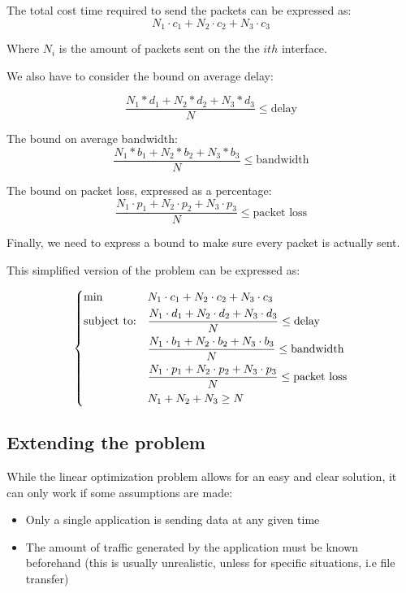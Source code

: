 \documentclass{article}
\begin{document}
The total cost time required to send the packets can be expressed as:
\[
	N_1 \cdot c_1 +
	N_2 \cdot c_2 +
	N_3 \cdot c_3 
\]

Where $N_i$ is the amount of packets sent on the the $ith$ interface.

We also have to consider the bound on average delay:

\[
	\frac
	{N_1 * d_1 + N_2 * d_2  + N_3 * d_3 }
	{N}
	 \le \text{delay}
\]

The bound on average bandwidth:
\[
\frac
{N_1 * b_1 + N_2 * b_2  + N_3 * b_3 }
{N}
\le \text{bandwidth}
\]

The bound on packet loss, expressed as a percentage:
\[
\frac
{N_1 \cdot p_1 + N_2 \cdot p_2 + N_3 \cdot p_3 }
{N}
\le \text{packet loss}
\]

Finally, we need to express a bound to make sure every packet is actually sent.

This simplified version of the problem can be expressed as: 

\begin{equation}\label{eq:linear_formulation_final}
	\begin{dcases}
		\begin{aligned}
			& {\text{min}}
			& & N_1 \cdot c_1 + N_2 \cdot c_2 +	N_3 \cdot c_3 \\
			& \text{subject to:}
			& & \frac
			{N_1 \cdot d_1 + N_2 \cdot d_2  + N_3 \cdot d_3 }
			{N}
			\le \text{delay} \\
			& & & \frac
			{N_1 \cdot b_1 + N_2 \cdot b_2  + N_3 \cdot b_3 }
			{N}
			\le \text{bandwidth} \\
			& & & \frac
			{N_1 \cdot p_1 + N_2 \cdot p_2 + N_3 \cdot p_3 }
			{N}
			\le \text{packet loss} \\
			& & &
			N_1 + N_2 + N_3 \ge N
		\end{aligned}
	\end{dcases}
\end{equation}



\subsection{Extending the problem}
While the linear optimization problem allows for an easy and clear solution, it can only work if some assumptions are made:

\begin{itemize}
	\item Only a single application is sending data at any given time
	\item The amount of traffic generated by the application must be known beforehand (this is usually unrealistic, unless for specific situations, i.e file transfer)
\end{itemize}
\end{document}
